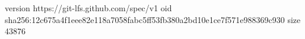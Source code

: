 version https://git-lfs.github.com/spec/v1
oid sha256:12c675a4f1eee82e118a7058fabc5ff53fb380a2bd10e1ce7f571e988369c930
size 43876
